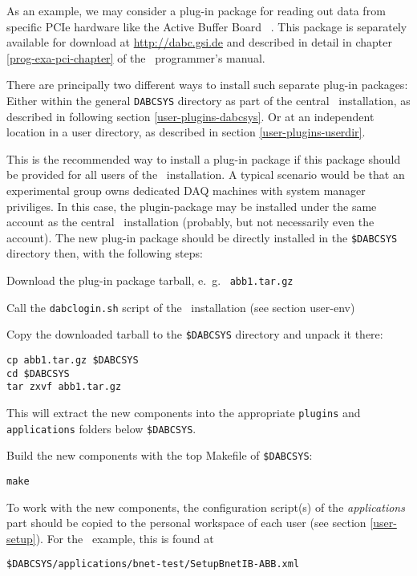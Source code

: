 As an example, we may consider a plug-in package for reading out data
from specific PCIe hardware like the Active Buffer Board \ABB\ \cite{AbbDescription}.
This package is separately available for download at \hyperref{http://dabc.gsi.de}{}{}{http://dabc.gsi.de}
and described in detail in chapter \ref{prog-exa-pci-chapter} of the \dabc\ programmer's manual.

There are principally two different ways to install such separate plug-in packages:
Either within the general {\tt DABCSYS} directory as part of the central \dabc\ installation, as
described in following section \ref{user-plugins-dabcsys}. Or at an independent location
in a user directory, as described in section \ref{user-plugins-userdir}.


This is the recommended way to install a plug-in package if this package should be provided
for all users of the \dabc\ installation. A typical scenario would be that an
experimental group owns dedicated DAQ machines with system manager priviliges.
In this case, the plugin-package may be installed under the same account as the
central \dabc\ installation (probably, but not necessarily even the  account).
The new plug-in package should be directly installed in the {\tt \$DABCSYS} directory
then, with the following steps:

\bnum
\item Download the plug-in package tarball, e.~g.~ {\tt abb1.tar.gz}

\item Call the {\tt dabclogin.sh} script of the \dabc\ installation (see section user-env)

\item Copy the downloaded tarball to the {\tt \$DABCSYS} directory and unpack it there:
\begin{verbatim}
cp abb1.tar.gz $DABCSYS
cd $DABCSYS
tar zxvf abb1.tar.gz
\end{verbatim} 
This will extract the new components into the appropriate {\tt plugins} and
{\tt applications} folders below {\tt \$DABCSYS}.

\item Build the new components with the top Makefile of {\tt \$DABCSYS}:
\begin{verbatim}
make
\end{verbatim} 

\item To work with the new components, the configuration script(s) of the {\em applications} part should be copied
to the personal workspace of each user (see section \ref{user-setup}).
For the \ABB\ example, this is found at
\begin{verbatim}
$DABCSYS/applications/bnet-test/SetupBnetIB-ABB.xml
\end{verbatim} 
\enum





